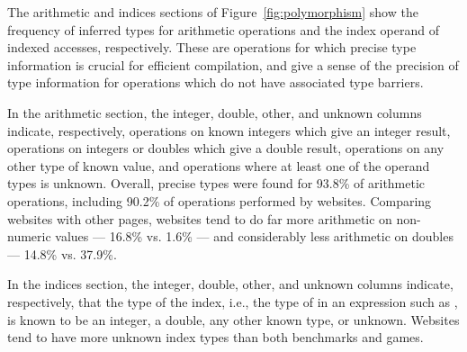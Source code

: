 The arithmetic and indices sections of Figure~\ref{fig:polymorphism} show the frequency
of inferred types for arithmetic operations and the index operand of
indexed accesses, respectively.
These are operations for which precise type information is crucial
for efficient compilation, and give a sense of the precision of type
information for operations which do not have associated type barriers.

In the arithmetic section, the integer, double, other, and unknown columns indicate,
respectively,
operations on known integers which give an integer result,
operations on integers or doubles which give a double result,
operations on any other type of known value,
and operations where at least one of the operand types is unknown.
Overall, precise types were found for 93.8\% of arithmetic operations,
including 90.2\% of operations performed by websites.
Comparing websites with other pages, websites tend to do far more
arithmetic on non-numeric values --- 16.8\% vs. 1.6\% ---
and considerably less arithmetic on doubles --- 14.8\% vs. 37.9\%.

In the indices section, the integer, double, other, and
unknown columns indicate, respectively, that the type of the index, i.e.,
the type of  in an expression such as , is known
to be an integer, a double, any other known type, or unknown. Websites tend to
have more unknown index types than both benchmarks and games.

